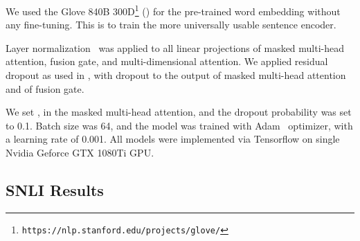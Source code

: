 \documentclass[11pt,letterpaper]{article}
\begin{document}
We used the Glove 840B 300D\footnote{\tt https://nlp.stanford.edu/projects/glove/} () for the pre-trained word embedding without any fine-tuning. This is to train the more universally usable sentence encoder. 

Layer normalization~\citep{LN} was applied to all linear projections of masked multi-head attention, fusion gate, and multi-dimensional attention. We applied residual dropout as used in \citet{AttentionAYN}, with dropout to the output of masked multi-head attention and  of fusion gate.

We set   ,    in the masked multi-head attention, and the dropout probability was set to 0.1. Batch size was 64, and the model was trained with Adam~\citep{Adam} optimizer, with a learning rate of 0.001. All models were implemented via Tensorflow on single Nvidia Geforce GTX 1080Ti GPU.

\subsection{SNLI Results}
\end{document}
